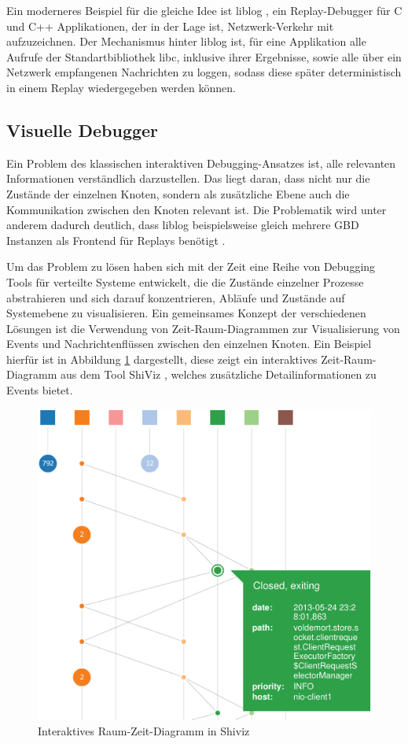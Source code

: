 \documentclass[12pt,a4paper]{report}
\begin{document}
Ein moderneres Beispiel für die gleiche Idee ist liblog \cite{distributed_replay_debugging_2006}, ein Replay-Debugger für C und
C++ Applikationen, der in der Lage ist, Netzwerk-Verkehr mit aufzuzeichnen. Der Mechanismus hinter liblog ist, für eine
Applikation alle Aufrufe der Standartbibliothek libc, inklusive ihrer Ergebnisse, sowie alle über ein Netzwerk empfangenen
Nachrichten zu loggen, sodass diese später deterministisch in einem Replay wiedergegeben werden können.

\subsection{Visuelle Debugger}
Ein Problem des klassischen interaktiven Debugging-Ansatzes ist, alle relevanten Informationen verständlich darzustellen. Das
liegt daran, dass nicht nur die Zustände der einzelnen Knoten, sondern als zusätzliche Ebene auch die Kommunikation
zwischen den Knoten relevant ist. Die Problematik wird unter anderem dadurch deutlich, dass liblog beispielsweise gleich mehrere
GBD Instanzen als Frontend für Replays benötigt \cite{distributed_replay_debugging_2006}.

Um das Problem zu lösen haben sich mit der Zeit eine Reihe von Debugging Tools für verteilte Systeme entwickelt, die die Zustände
einzelner Prozesse abstrahieren und sich darauf konzentrieren, Abläufe und Zustände auf Systemebene zu visualisieren. Ein
gemeinsames Konzept der verschiedenen Lösungen ist die Verwendung von Zeit-Raum-Diagrammen zur Visualisierung von Events und
Nachrichtenflüssen zwischen den einzelnen Knoten. Ein Beispiel hierfür ist in Abbildung \ref{fig:shiviz} dargestellt, diese zeigt
ein interaktives Zeit-Raum-Diagramm aus dem Tool ShiViz \cite{ShiViz_visual_debugger}, welches zusätzliche Detailinformationen zu
Events bietet.

\begin{figure}[H]
	\centering
	\includegraphics[width=\linewidth]{img/shiviz_time_space.pdf}
	\caption{Interaktives Raum-Zeit-Diagramm in Shiviz \cite{ShiViz_visual_debugger}}
	\label{fig:shiviz}
\end{figure}
\end{document}
